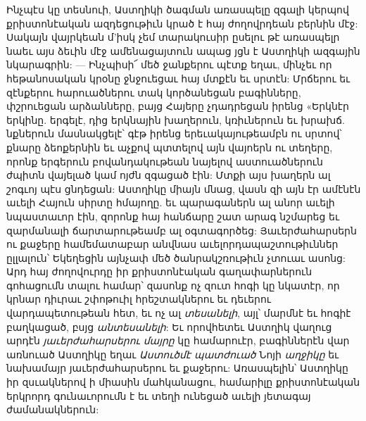 \documentclass{article}
\begin{document}
{Ինչպէս կը տեսնուի, Աստղիկի ծագման առասպելը զգալի կերպով քրիստոնէական ազդեցութիւն կրած է հայ ժողովրդեան բերնին մէջ: Սակայն վայրկեան մ'իսկ չեմ տարակուսիր ըսելու թէ առասպելր նաեւ այս ձեւին մէջ ամենացայտուն ապաց յցն է Աստղիկի ազգային նկարագրին: — Ինչպիսի՜ մեծ ջանքերու պէտք եղաւ, մինչեւ որ հեթանոսական կրօնը ջնջուեցաւ հայ մտքէն եւ սրտէն: Մրճերու եւ զէնքերու հարուածներու տակ կործանեցան բագինները, փշրուեցան արձանները, բայց Հայերը չդադրեցան իրենց «Երկնէր երկինը. երգելէ, դից երկնային խաղերուն, կռիւներուն եւ խրախճ. նքներուն մասնակցելէ՝ գէթ իրենց երեւակայութեամբն ու սրտով՝ քնարը ձեոքերնին եւ աչքով պտտելով այն վայոերն ու տեղերը, որոնք երգերուն բովանդակութեան նայելով աստուածներուն ժպիտն վայելած կամ ոյժն զգացած էին: Մտքի այս խաղերն ալ շոգւոյ պէս ցնդեցան: Աստղիկը միայն մնաց, վասն զի այն էր ամէնէն աւելի Հայուն սիրտը հմայողը. եւ պարագաներն ալ անոր աւելի նպաստաւոր էին, զորոնք հայ հանճարը շատ արագ նշմարեց եւ զարմանալի ճարտարութեամբ ալ օգտագործեց: Յաւերժահարսերն ու քաջերը համեմատաբար անվնաս աւելորդապաշտութիւններ ըլլալուն՝ Եկեղեցին այնչափ մեծ ծանրակշռութիւն չտուաւ ասոնց: Արդ հայ ժողովուրդը իր քրիստոնէական գաղափարներուն գոհացումն տալու համար՝ զասոնք ոչ զուտ հոգի կը նկատէր, որ կրնար դիւրաւ շփոթուիլ հրեշտակներու եւ դեւերու վարդապետութեան հետ, եւ ոչ ալ \emph{տեսանելի}, այլ՝ մարմնէ եւ հոգիէ բաղկացած, բսյց \emph{անտեսանելի}: Եւ որովհետեւ Աստղիկ վաղուց արդէն \emph{յաւերժահարսերու մայրը} կը համարուէր, բագիններէն վար առնուած Աստղիկը եղաւ \emph{Աստուծմէ պատժուած} Նոյի \emph{աղջիկը} եւ նախամայր յաւերժահարսերու եւ քաջերու: Առասպելին՝ Աստղիկը իր զսւակներով ի միասին մահկանացու, համարիլը քրիստոնէական երկրորդ գունաւորումն է եւ տեղի ունեցած աւելի յետագայ ժամանակներուն:

}
\end{document}
